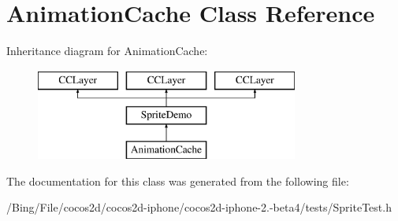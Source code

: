 \hypertarget{interface_animation_cache}{\section{Animation\-Cache Class Reference}
\label{interface_animation_cache}
}
Inheritance diagram for Animation\-Cache\-:\begin{figure}[H]
\begin{center}
\leavevmode
\includegraphics[height=3.000000cm]{interface_animation_cache}
\end{center}
\end{figure}


The documentation for this class was generated from the following file\-:\begin{DoxyCompactItemize}
\item 
/\-Bing/\-File/cocos2d/cocos2d-\/iphone/cocos2d-\/iphone-\/2.-\/beta4/tests/Sprite\-Test.\-h\end{DoxyCompactItemize}
